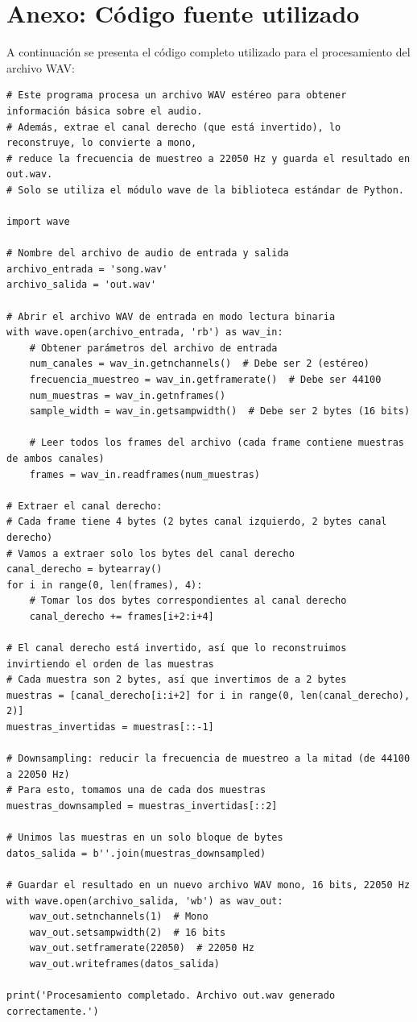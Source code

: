 \documentclass[12pt]{article}
\begin{document}
\section*{Anexo: Código fuente utilizado}
A continuación se presenta el código completo utilizado para el procesamiento del archivo WAV:

\begin{verbatim}
# Este programa procesa un archivo WAV estéreo para obtener información básica sobre el audio.
# Además, extrae el canal derecho (que está invertido), lo reconstruye, lo convierte a mono,
# reduce la frecuencia de muestreo a 22050 Hz y guarda el resultado en out.wav.
# Solo se utiliza el módulo wave de la biblioteca estándar de Python.

import wave

# Nombre del archivo de audio de entrada y salida
archivo_entrada = 'song.wav'
archivo_salida = 'out.wav'

# Abrir el archivo WAV de entrada en modo lectura binaria
with wave.open(archivo_entrada, 'rb') as wav_in:
    # Obtener parámetros del archivo de entrada
    num_canales = wav_in.getnchannels()  # Debe ser 2 (estéreo)
    frecuencia_muestreo = wav_in.getframerate()  # Debe ser 44100
    num_muestras = wav_in.getnframes()
    sample_width = wav_in.getsampwidth()  # Debe ser 2 bytes (16 bits)

    # Leer todos los frames del archivo (cada frame contiene muestras de ambos canales)
    frames = wav_in.readframes(num_muestras)

# Extraer el canal derecho:
# Cada frame tiene 4 bytes (2 bytes canal izquierdo, 2 bytes canal derecho)
# Vamos a extraer solo los bytes del canal derecho
canal_derecho = bytearray()
for i in range(0, len(frames), 4):
    # Tomar los dos bytes correspondientes al canal derecho
    canal_derecho += frames[i+2:i+4]

# El canal derecho está invertido, así que lo reconstruimos invirtiendo el orden de las muestras
# Cada muestra son 2 bytes, así que invertimos de a 2 bytes
muestras = [canal_derecho[i:i+2] for i in range(0, len(canal_derecho), 2)]
muestras_invertidas = muestras[::-1]

# Downsampling: reducir la frecuencia de muestreo a la mitad (de 44100 a 22050 Hz)
# Para esto, tomamos una de cada dos muestras
muestras_downsampled = muestras_invertidas[::2]

# Unimos las muestras en un solo bloque de bytes
datos_salida = b''.join(muestras_downsampled)

# Guardar el resultado en un nuevo archivo WAV mono, 16 bits, 22050 Hz
with wave.open(archivo_salida, 'wb') as wav_out:
    wav_out.setnchannels(1)  # Mono
    wav_out.setsampwidth(2)  # 16 bits
    wav_out.setframerate(22050)  # 22050 Hz
    wav_out.writeframes(datos_salida)

print('Procesamiento completado. Archivo out.wav generado correctamente.')
\end{verbatim}
\end{document}
